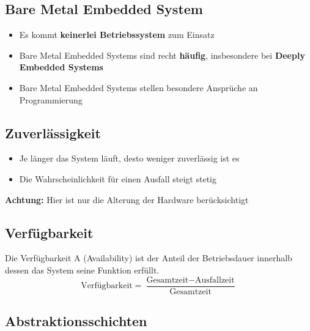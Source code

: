 \subsection{Bare Metal Embedded System}

\begin{itemize}
    \item Es kommt \textbf{keinerlei Betriebssystem} zum Einsatz
    \item Bare Metal Embedded Systems sind recht \textbf{häufig}, insbesondere bei \textbf{Deeply Embedded Systems}
    \item Bare Metal Embedded Systems stellen besondere Ansprüche an Programmierung
\end{itemize}


\subsection{Zuverlässigkeit}

\begin{minipage}[c]{0.56\columnwidth}
    
\end{minipage}
\hfill
\begin{minipage}[c]{0.42\columnwidth}
    \raggedright

    \begin{itemize}
        \item Je länger das System läuft, desto weniger zuverlässig ist es
        \item Die Wahrscheinlichkeit für einen Ausfall steigt stetig
    \end{itemize}
    
    \vspace{0.2cm}

    \textbf{Achtung:} Hier ist nur die Alterung der Hardware berücksichtigt
\end{minipage}


\subsection{Verfügbarkeit}

Die Verfügbarkeit A (Availability) ist der Anteil der Betriebsdauer innerhalb dessen das System seine Funktion erfüllt.
$$ \text{Verfügbarkeit} = \frac{\text{Gesamtzeit} - \text{Ausfallzeit}}{\text{Gesamtzeit}} $$


\subsection{Abstraktionsschichten}
\label{Abstraktionsschichten}

